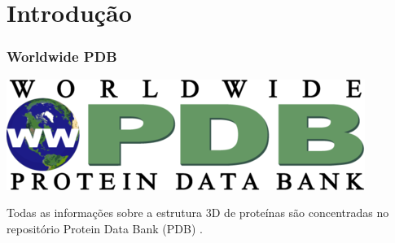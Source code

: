 \documentclass[10pt]{beamer}
\theoremstyle{plain}
\theoremstyle{definition}
\begin{document}
	\begin{frame}
		\tableofcontents 
	\end{frame}
	
	\section{Introdução}
	
	\begin{frame}
		\frametitle{\normalsize Worldwide PDB } 
		{
			\small
			
			\begin{center}
				\includegraphics[width=0.4\linewidth]{wwpdb-logo.png}	
			\end{center}
			
			Todas as informações sobre a estrutura 3D de proteínas são concentradas no repositório Protein Data Bank (PDB) \cite{PDB}.
			
}
\end{frame}
\end{document}
